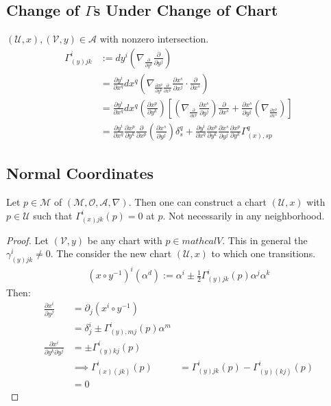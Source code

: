 \documentclass[10pt, oneside]{article}
\newcommand{\M}{\mathcal{M}}
\begin{document}
   \subsection{Change of $\Gamma$s Under Change of Chart}
      $(\mathcal{U},x),(\mathcal{V},y) \in \mathcal{A}$ with nonzero intersection. 
      \begin{align*}
         \Gamma_{(y)jk}^i &:= dy^i (\nabla_{\frac{\partial}{\partial y^k}} \frac{\partial}{\partial y^j}) \\
         &= \frac{\partial y^i}{\partial x^q} dx^q (\nabla_{\frac{\partial x^p}{\partial y^k} \frac{\partial}{\partial x^p}} \frac{\partial x^s}{\partial x^j} \cdot \frac{\partial}{\partial x^s}) \\
          &= \frac{\partial y^i}{\partial x^q} dx^q (\frac{\partial x^p}{\partial y^k})[(\nabla_{\frac{\partial}{\partial x^p}} \frac{\partial x^s}{\partial y^j}) \frac{\partial}{\partial x^s} + \frac{\partial x^s}{\partial y^j} (\nabla_{\frac{\partial x^p}{\partial x^s}})] \\
         &= \frac{\partial y^i}{\partial x^q} \frac{\partial x^p}{\partial y^k}\frac{\partial}{\partial x^p} (\frac{\partial x^s}{\partial y^j}) \delta^q_s + \frac{\partial y^i}{\partial x^q} \frac{\partial x^p}{\partial y^k} \frac{\partial x^s}{\partial y^j} \frac{\partial x^p}{\partial y^k} \Gamma_{(x),sp}^q 
         \end{align*}
   \subsection{Normal Coordinates}
   Let $p \in \M$ of $(\M, \mathcal{O},\mathcal{A},\nabla)$. Then one can construct a chart $(\mathcal{U},x)$ with $p \in \mathcal{U}$ such that $\Gamma_{(x) jk}^i (p)=0$ at $p$. Not necessarily in any neighborhood.
   \begin{proof}
   Let $(\mathcal{V},y)$ be any chart with $p \in mathcal{V}$. This in general the $\gamma_{(y)jk}^i \neq 0$. The consider the new chart $(\mathcal{U},x)$ to which one transitions.
   \begin{align*}
      (x \circ y^{-1})^i (\alpha^d) := \alpha^i \pm \frac{1}{2} \Gamma^i_{(y)jk} (p) \alpha^j \alpha^k 
   \end{align*} 
   Then: 
   \begin{align*}
      \frac{\partial x^i}{\partial y^j} &= \partial_j (x^i \circ y^{-1} ) \\
      & = \delta^i_j \pm \Gamma^i_{(y), mj}(p) \alpha^m \\
      \frac{\partial x^i}{\partial y^k \partial y^j} &= \pm \Gamma^i_{(y) kj} (p) \\
      & \implies
      \Gamma^i_{(x)(jk)} (p) &= \Gamma_{(y) jk}^i (p) - \Gamma^i_{(y)(kj)}(p) \\
      &= 0
   \end{align*}
   \end{proof}
\end{document}

